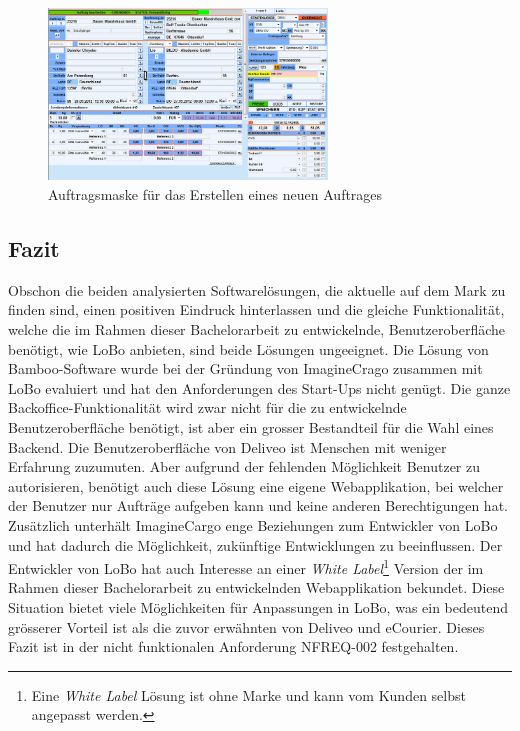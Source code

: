 \begin{figure}[ht]
	\centering
  \includegraphics[width=0.66\textwidth]{images/bambooNew.jpg}
	\caption{Auftragsmaske für das Erstellen eines neuen Auftrages}
	\label{fig1:bamboonew}
\end{figure}

\subsection{Fazit}
Obschon die beiden analysierten Softwarelösungen, die aktuelle auf dem Mark zu finden sind, einen positiven Eindruck hinterlassen und die gleiche Funktionalität, welche die im Rahmen dieser Bachelorarbeit zu entwickelnde, Benutzeroberfläche benötigt, wie LoBo anbieten, sind beide Lösungen ungeeignet. Die Lösung von Bamboo-Software wurde bei der Gründung von ImagineCrago zusammen mit LoBo evaluiert und hat den Anforderungen des Start-Ups nicht genügt. Die ganze Backoffice-Funktionalität wird zwar nicht für die zu entwickelnde Benutzeroberfläche benötigt, ist aber ein grosser Bestandteil für die Wahl eines Backend. Die Benutzeroberfläche von Deliveo ist Menschen mit weniger Erfahrung zuzumuten. Aber aufgrund der fehlenden Möglichkeit Benutzer zu autorisieren, benötigt auch diese Lösung eine eigene Webapplikation, bei welcher der Benutzer nur Aufträge aufgeben kann und keine anderen Berechtigungen hat. Zusätzlich unterhält ImagineCargo enge Beziehungen zum Entwickler von LoBo und hat dadurch die Möglichkeit, zukünftige Entwicklungen zu beeinflussen. Der Entwickler von LoBo hat auch Interesse an einer \textit{White Label}\footnote{ Eine \textit{White Label} Lösung ist ohne Marke und kann vom Kunden selbst angepasst werden.} Version der im Rahmen dieser Bachelorarbeit zu entwickelnden Webapplikation bekundet. Diese Situation bietet viele Möglichkeiten für Anpassungen in LoBo, was ein bedeutend grösserer Vorteil ist als die zuvor erwähnten von Deliveo und eCourier. Dieses Fazit ist in der nicht funktionalen Anforderung NFREQ-002 festgehalten.